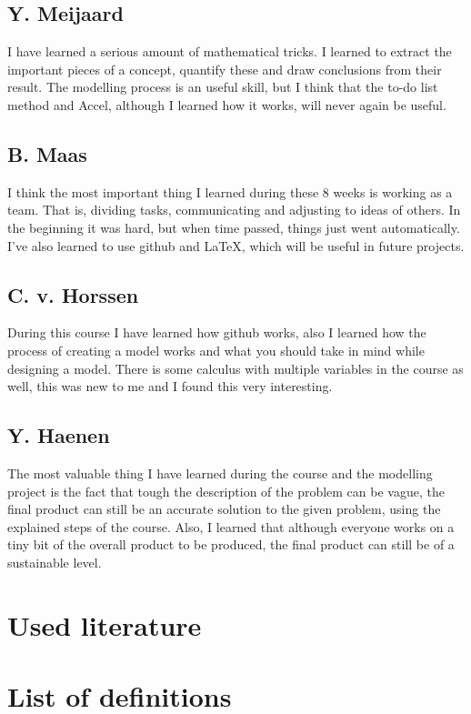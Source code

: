 \documentclass[a4paper, 11pt, notitlepage]{report}
\begin{document}
	\section*{Y. Meijaard}
	I have learned a serious amount of mathematical tricks. I learned to extract the important pieces of a concept, quantify these and draw conclusions from their result. The modelling process is an useful skill, but I think that the to-do list method and Accel, although I learned how it works, will never again be useful.
	
	\section*{B. Maas}
	I think the most important thing I learned during these 8 weeks is working as a team. That is, dividing tasks, communicating and adjusting to ideas of others. In the beginning it was hard, but when time passed, things just went automatically. I've also learned to use github and LaTeX, which will be useful in future projects.

\section*{C. v. Horssen} During this course I have learned how github works, also I learned how the process of creating a model works and what you should take in mind while designing a model. There is some calculus with multiple variables in the course as well, this was new to me and I found this very interesting.

\section*{Y. Haenen}
The most valuable thing I have learned during the course and the modelling project is the fact that tough the description of the problem can be vague, the final product can still be an accurate solution to the given problem, using the explained steps of the course. Also, I learned that although everyone works on a tiny bit of the overall product to be produced, the final product can still be of a sustainable level.

\chapter{Used literature}

\chapter{List of definitions}
\end{document}
